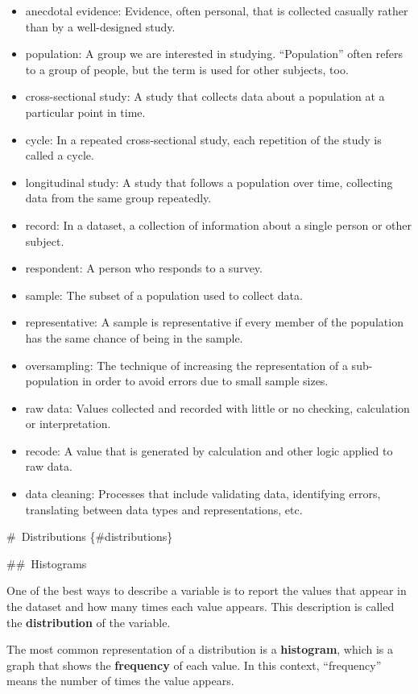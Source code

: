 \documentclass[]{book}
\begin{document}
\begin{itemize}
\item
  anecdotal evidence: Evidence, often
  personal, that is collected casually rather than by a well-designed
  study.
\item
  population: A group we are
  interested in studying. ``Population'' often refers to a group of
  people, but the term is used for other subjects, too.
\item
  cross-sectional study: A study that
  collects data about a population at a particular point in time.
\item
  cycle: In a repeated cross-sectional
  study, each repetition of the study is called a cycle.
\item
  longitudinal study: A study that
  follows a population over time, collecting data from the same group
  repeatedly.\\
\item
  record: In a dataset, a collection
  of information about a single person or other subject.
\item
  respondent: A person who responds to
  a survey.
\item
  sample: The subset of a population
  used to collect data.
\item
  representative: A sample is
  representative if every member of the population has the same chance
  of being in the sample.
\item
  oversampling: The technique of
  increasing the representation of a sub-population in order to avoid
  errors due to small sample sizes.
\item
  raw
  data: Values collected and recorded with little or no
  checking, calculation or interpretation.
\item
  recode: A value that is generated by
  calculation and other logic applied to raw data.
\item
  data
  cleaning: Processes that include validating data, identifying
  errors, translating between data types and representations,
  etc.
\end{itemize}

\#~Distributions \{\#distributions\}

\#\#~Histograms

One of the best ways to describe a
variable is to report the values that appear in the dataset and how many
times each value appears. This description is called the \textbf{distribution} of the variable.

The most common representation of a
distribution is a \textbf{histogram}, which
is a graph that shows the \textbf{frequency} of each value. In this
context, ``frequency'' means the number of times the value appears.
\end{document}
